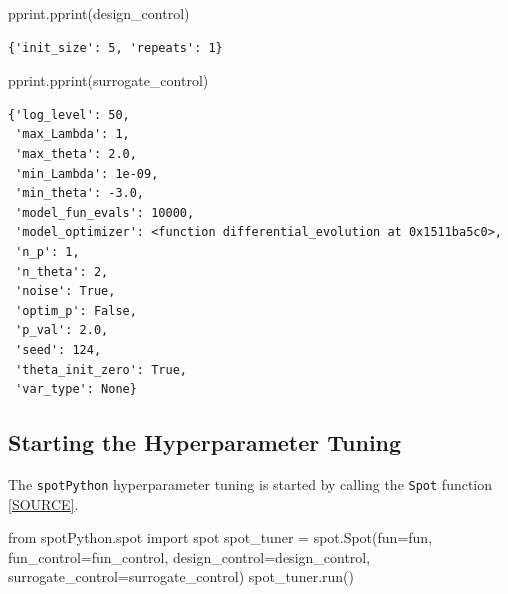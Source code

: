 \documentclass[
  letterpaper,
  DIV=11,
  numbers=noendperiod]{scrreprt}
\newenvironment{Shaded}{\begin{snugshade}}{\end{snugshade}}
\newcommand{\ImportTok}[1]{\textcolor[rgb]{0.00,0.46,0.62}{#1}}
\newcommand{\NormalTok}[1]{\textcolor[rgb]{0.00,0.23,0.31}{#1}}
\newcommand{\OperatorTok}[1]{\textcolor[rgb]{0.37,0.37,0.37}{#1}}
\begin{document}
\begin{Shaded}
\begin{Highlighting}[]
\NormalTok{pprint.pprint(design\_control)}
\end{Highlighting}
\end{Shaded}

\begin{verbatim}
{'init_size': 5, 'repeats': 1}
\end{verbatim}

\begin{Shaded}
\begin{Highlighting}[]
\NormalTok{pprint.pprint(surrogate\_control)}
\end{Highlighting}
\end{Shaded}

\begin{verbatim}
{'log_level': 50,
 'max_Lambda': 1,
 'max_theta': 2.0,
 'min_Lambda': 1e-09,
 'min_theta': -3.0,
 'model_fun_evals': 10000,
 'model_optimizer': <function differential_evolution at 0x1511ba5c0>,
 'n_p': 1,
 'n_theta': 2,
 'noise': True,
 'optim_p': False,
 'p_val': 2.0,
 'seed': 124,
 'theta_init_zero': True,
 'var_type': None}
\end{verbatim}

\subsection{Starting the Hyperparameter
Tuning}\label{sec-call-the-hyperparameter-tuner-32}

The \texttt{spotPython} hyperparameter tuning is started by calling the
\texttt{Spot} function
\href{https://github.com/sequential-parameter-optimization/spotPython/blob/main/src/spotPython/spot/spot.py}{{[}SOURCE{]}}.

\begin{Shaded}
\begin{Highlighting}[]
\ImportTok{from}\NormalTok{ spotPython.spot }\ImportTok{import}\NormalTok{ spot}
\NormalTok{spot\_tuner }\OperatorTok{=}\NormalTok{ spot.Spot(fun}\OperatorTok{=}\NormalTok{fun,}
\NormalTok{                       fun\_control}\OperatorTok{=}\NormalTok{fun\_control,}
\NormalTok{                       design\_control}\OperatorTok{=}\NormalTok{design\_control,}
\NormalTok{                       surrogate\_control}\OperatorTok{=}\NormalTok{surrogate\_control)}
\NormalTok{spot\_tuner.run()}
\end{Highlighting}
\end{Shaded}
\end{document}
